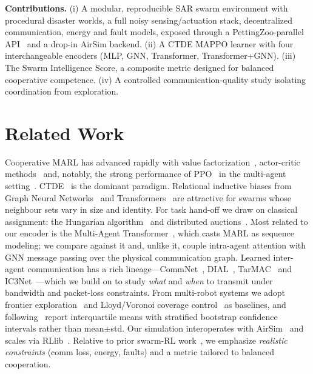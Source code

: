 \documentclass[twocolumn,10pt]{article}
\begin{document}
\noindent\textbf{Contributions.}
(i) A modular, reproducible SAR swarm environment with procedural disaster worlds,
a full noisy sensing/actuation stack, decentralized communication, energy and
fault models, exposed through a PettingZoo-parallel API~\cite{terry2021pettingzoo}
and a drop-in AirSim backend. (ii) A CTDE MAPPO learner with four interchangeable encoders
(MLP, GNN, Transformer, Transformer+GNN). (iii) The Swarm Intelligence Score, a
composite metric designed for balanced cooperative competence. (iv) A controlled
communication-quality study isolating coordination from exploration.

\section{Related Work}
Cooperative MARL has advanced rapidly with value factorization~\cite{rashid2018qmix},
actor-critic methods~\cite{lowe2017maddpg,foerster2018coma} and, notably, the
strong performance of PPO~\cite{schulman2017ppo} in the multi-agent
setting~\cite{yu2022mappo}. CTDE~\cite{oliehoek2016decpomdp} is the dominant
paradigm. Relational inductive biases from Graph Neural
Networks~\cite{velickovic2018gat,hamilton2017graphsage} and
Transformers~\cite{vaswani2017attention} are attractive for swarms whose neighbour
sets vary in size and identity. For task hand-off we draw on classical assignment:
the Hungarian algorithm~\cite{kuhn1955hungarian} and distributed
auctions~\cite{bertsekas1988auction}. Most related to our encoder is the Multi-Agent
Transformer~\cite{wen2022mat}, which casts MARL as sequence modeling; we compare
against it and, unlike it, couple intra-agent attention with GNN message passing
over the physical communication graph. Learned inter-agent communication has a rich
lineage---CommNet~\cite{sukhbaatar2016commnet}, DIAL~\cite{foerster2016dial},
TarMAC~\cite{das2019tarmac} and IC3Net~\cite{singh2019ic3net}---which we build on to
study \emph{what} and \emph{when} to transmit under bandwidth and packet-loss
constraints. From multi-robot systems we adopt frontier
exploration~\cite{yamauchi1997frontier} and Lloyd/Voronoi coverage
control~\cite{cortes2004coverage} as baselines, and following~\cite{agarwal2021rliable}
report interquartile means with stratified bootstrap confidence intervals rather than
mean$\pm$std. Our simulation interoperates with AirSim~\cite{shah2018airsim} and
scales via RLlib~\cite{liang2018rllib}. Relative to prior swarm-RL
work~\cite{macua2020swarm}, we emphasize \emph{realistic constraints} (comm loss,
energy, faults) and a metric tailored to balanced cooperation.
\end{document}
